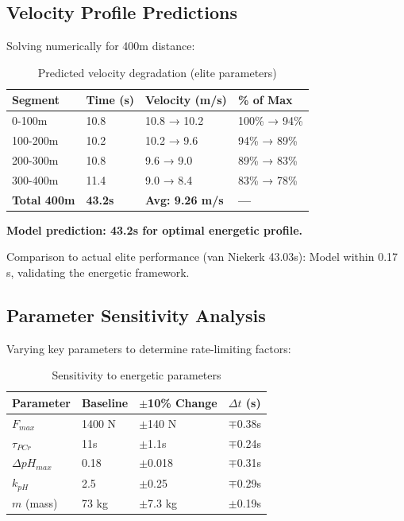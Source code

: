 \subsection{Velocity Profile Predictions}

Solving numerically for 400m distance:

\begin{table}[H]
\centering
\caption{Predicted velocity degradation (elite parameters)}
\begin{tabular}{@{}llll@{}}
\toprule
\textbf{Segment} & \textbf{Time (s)} & \textbf{Velocity (m/s)} & \textbf{\% of Max} \\
\midrule
0-100m & 10.8 & 10.8 → 10.2 & 100\% → 94\% \\
100-200m & 10.2 & 10.2 → 9.6 & 94\% → 89\% \\
200-300m & 10.8 & 9.6 → 9.0 & 89\% → 83\% \\
300-400m & 11.4 & 9.0 → 8.4 & 83\% → 78\% \\
\midrule
\textbf{Total 400m} & \textbf{43.2s} & \textbf{Avg: 9.26 m/s} & \textbf{—} \\
\bottomrule
\end{tabular}
\end{table}

\textbf{Model prediction: 43.2s for optimal energetic profile.}

Comparison to actual elite performance (van Niekerk 43.03s): Model within 0.17 s, validating the energetic framework.

\subsection{Parameter Sensitivity Analysis}

Varying key parameters to determine rate-limiting factors:

\begin{table}[H]
\centering
\caption{Sensitivity to energetic parameters}
\begin{tabular}{@{}llll@{}}
\toprule
\textbf{Parameter} & \textbf{Baseline} & \textbf{$\pm$10\% Change} & \textbf{$\Delta t$ (s)} \\
\midrule
$F_{max}$ & 1400 N & $\pm$140 N & $\mp$0.38s \\
$\tau_{PCr}$ & 11s & $\pm$1.1s & $\mp$0.24s \\
$\Delta pH_{max}$ & 0.18 & $\pm$0.018 & $\mp$0.31s \\
$k_{pH}$ & 2.5 & $\pm$0.25 & $\mp$0.29s \\
$m$ (mass) & 73 kg & $\pm$7.3 kg & $\pm$0.19s \\
\bottomrule
\end{tabular}
\end{table}

